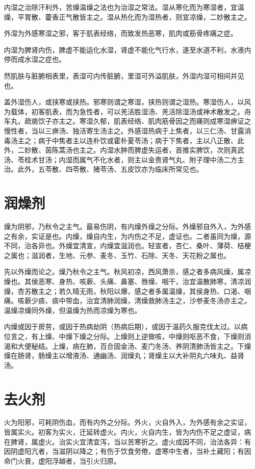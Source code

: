 \documentclass[UTF8]{ctexart}
\begin{document}
内湿之治除汗利外，苦燥温燥之法也为治湿之常法。湿从寒化而为寒湿者，宜温燥，平胃散、藿香正气散皆主之。湿从热化而为湿热者，则宜凉燥，二妙散主之。

外湿为外感寒湿之邪，客于肌表经络，而致发热恶寒，肌肉或筋骨疼痛之症。

内湿为脾肾内伤，脾虚不能运化水湿，肾虚不能化气行水，遂至水道不利，水液内停而成水湿之症也。

然肌肤与脏腑相表里，表湿可内传脏腑，里湿可外溢肌肤，外湿内湿可相间并见也。

盖外湿伤人，或挟寒或挟热。邪寒则谓之寒湿，挟热则谓之湿热。寒湿伤人，以风为载体，初客肌表，而为急性者，可以羌活胜湿汤、羌活除湿汤或神术散发之。舟车丸，疏凿饮子亦主之。寒湿久郁，肌表经络、肌肉筋骨因之而痛则成寒湿痹证之慢性者，当以三痹汤、独活寄生汤主之。外感湿热病于上焦者，以三仁汤、甘露消毒汤主之；病于中焦者主以连朴饮或霍朴夏苓汤；病于下焦者，主以八正散、此外，二妙散、茵陈蒿汤也主之。内湿水肿而脾虚失运者，首推实脾饮，次则真武汤、苓桂术甘汤；内湿而属气不化水者，则主以金贵肾气丸、附子理中汤二方主治。此外，五苓散、四苓散、猪苓汤、五皮饮亦为临床所常见也。

\section{润燥剂}
燥为阴邪，乃秋令之主气。最易伤阴，有内燥外燥之分际。外燥邪自外入，为外感之有余，实证是也。内燥，燥自内生，为内伤之不足，虚证也。二者虽同为燥，源不同，治各异也。外燥宜清宣，内燥宜滋润也。轻宣者，杏仁、桑叶、薄荷、桔梗之属也；滋润者，生地、元参、麦冬、玉竹、石除、天冬、天花粉之属也。

先以外燥而论之。燥乃秋令之主气。秋风初凉，西风萧杀，感之者多病风燥，属凉燥也。其侯恶寒、身热、咳蔌、头痛、鼻塞、唇燥、咽干，治宜温散肺寒，清凉润燥，杏苏散主之；若久晴无雨，秋阳以爆，感之者多属温燥，其侯身热、口渴、咽痛。咳蔌少痰、痰中带血，治宜清肺润燥，清燥救肺汤主之，沙参麦冬汤亦主之。温燥凉燥同外燥，但温燥为热而凉燥为寒也。

内燥或因于房劳，或因于热病劫阴（热病后期），或因于温药久服克伐太过。以病位言之，有上燥、中燥下燥之分际。上燥则上逆做咳，中燥则呕恶不食，下燥则消渴和大便秘结。上燥，病在肺，百合固金汤、麦门冬汤、养阴清肺汤皆主之。下燥燥在肠肾，肠燥主以增液汤、通幽汤、润燥丸；肾燥主以大补阴丸六味丸、益肾汤。

\section{去火剂}
火为阳邪，可耗阴伤血，而有内外之分际。外火，火自外入，为外感有余之实证，皆属实火。初客为实火，迁延转虚火。内火，火自内生，皆为内伤不足之虚证，病在脾肾，属虚火。治实火宜清宜泻，当以苦寒折之。虚火成因不同，治法各异：有因阴虚阳亢者，当滋阴以降之；有伤于饮食劳倦，虚寒中生者，当补土藏阳；有因命门火衰，虚阳浮越者，当引火归原。
\end{document}
